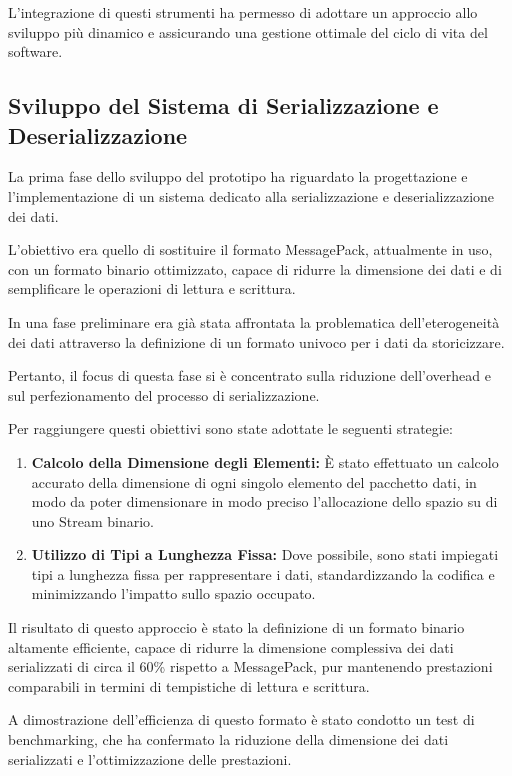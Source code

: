 \documentclass[12pt,a4paper,openright,twoside]{book}
\begin{document}
            L'integrazione di questi strumenti ha permesso di adottare un approccio allo sviluppo più dinamico e assicurando una gestione ottimale del ciclo di vita del software.

        \subsection{Sviluppo del Sistema di Serializzazione e Deserializzazione}

            La prima fase dello sviluppo del prototipo ha riguardato la progettazione e l’implementazione di un sistema dedicato alla serializzazione e deserializzazione dei dati.

            L’obiettivo era quello di sostituire il formato MessagePack, attualmente in uso, con un formato binario ottimizzato, capace di ridurre la dimensione dei dati e di semplificare le operazioni di lettura e scrittura.

            In una fase preliminare era già stata affrontata la problematica dell’eterogeneità dei dati attraverso la definizione di un formato univoco per i dati da storicizzare.

            Pertanto, il focus di questa fase si è concentrato sulla riduzione dell’overhead e sul perfezionamento del processo di serializzazione.

            Per raggiungere questi obiettivi sono state adottate le seguenti strategie:
            \begin{enumerate}
                \item \textbf{Calcolo della Dimensione degli Elementi:} È stato effettuato un calcolo accurato della dimensione di ogni singolo elemento del pacchetto dati, in modo da poter dimensionare in modo preciso l’allocazione dello spazio su di uno Stream binario.
                \item \textbf{Utilizzo di Tipi a Lunghezza Fissa:} Dove possibile, sono stati impiegati tipi a lunghezza fissa per rappresentare i dati, standardizzando la codifica e minimizzando l’impatto sullo spazio occupato.
            \end{enumerate}

            Il risultato di questo approccio è stato la definizione di un formato binario altamente efficiente, capace di ridurre la dimensione complessiva dei dati serializzati di circa il 60\% rispetto a MessagePack, pur mantenendo prestazioni comparabili in termini di tempistiche di lettura e scrittura.

            A dimostrazione dell'efficienza di questo formato è stato condotto un test di benchmarking, che ha confermato la riduzione della dimensione dei dati serializzati e l'ottimizzazione delle prestazioni.
\end{document}
